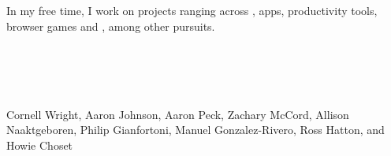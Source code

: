 \begin{resume}



\section{}
In my free time, I work on projects ranging across ,
 apps, productivity tools, browser games and , among
other pursuits.

\begin{formatb}
  \\
  \body\\
\end{formatb}

\section{}

Cornell Wright, Aaron Johnson, Aaron Peck, Zachary McCord, Allison Naaktgeboren, Philip Gianfortoni, Manuel Gonzalez-Rivero, Ross Hatton, and Howie Choset


\end{resume}

